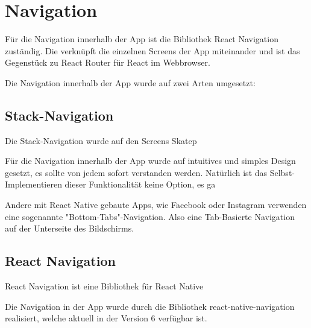 \chapter{Navigation}
Für die Navigation innerhalb der App ist die Bibliothek React Navigation zuständig. Die verknüpft
die einzelnen Screens der App miteinander und ist das Gegenstück zu React Router für React im
Webbrowser.

Die Navigation innerhalb der App wurde auf zwei Arten umgesetzt:

\section{Stack-Navigation}
Die Stack-Navigation wurde auf den Screens Skatep


Für die Navigation innerhalb der App wurde auf intuitives und simples Design gesetzt, es sollte von
jedem sofort verstanden werden. Natürlich ist das Selbst-Implementieren dieser Funktionalität keine
Option, es ga


Andere mit React Native gebaute Apps, wie Facebook oder Instagram
verwenden eine sogenannte "Bottom-Tabs"-Navigation. Also eine Tab-Basierte Navigation auf der
Unterseite des Bildschirms.

\section{React Navigation}
React Navigation ist eine Bibliothek für React Native


Die Navigation in der App wurde durch die Bibliothek react-native-navigation realisiert, welche
aktuell in der Version 6 verfügbar ist.
